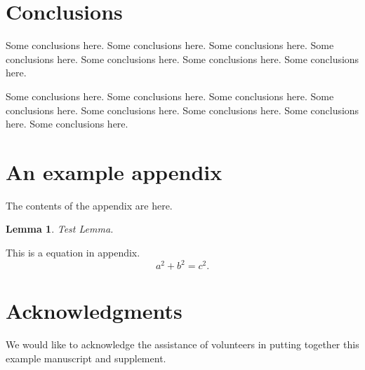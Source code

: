 \documentclass[10pt,reqno,final]{article}
\theoremstyle{plain}
\newtheorem{lemma}{Lemma}[section]
\theoremstyle{definition}
\theoremstyle{remark}
\numberwithin{equation}{section}
\numberwithin{figure}{section}
\numberwithin{table}{section}
\begin{document}
\section{Conclusions}
\label{sec:conclusions}

Some conclusions here. Some conclusions here. Some conclusions here. Some conclusions here. Some conclusions here. Some conclusions here. Some conclusions here.

Some conclusions here. Some conclusions here. Some conclusions here. Some conclusions here. Some conclusions here. Some conclusions here. Some conclusions here. Some conclusions here.

\appendix
\section{An example appendix}

The contents of the appendix are here.

\begin{lemma}
Test Lemma.
\end{lemma}

This is a equation in appendix.
\begin{equation}\label{eq:A1}
  a^2+b^2=c^2.
\end{equation}

\section*{Acknowledgments}
We would like to acknowledge the assistance of volunteers in putting
together this example manuscript and supplement.



%


\end{document}

